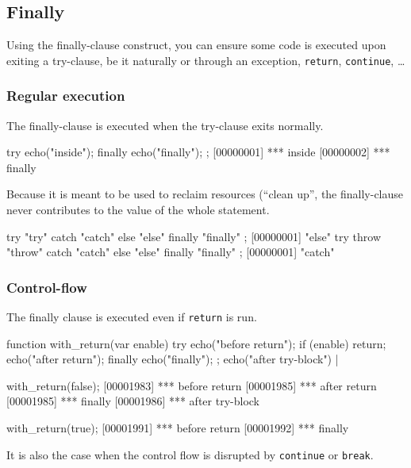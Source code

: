 \subsection{Finally}
\label{sec:lang:except:finally}
Using the finally-clause construct, you can ensure some code is executed
upon exiting a try-clause, be it naturally or through an exception,
\lstinline{return}, \lstinline{continue}, \ldots

\subsubsection{Regular execution}

The finally-clause is executed when the try-clause exits normally.

\begin{urbiscript}
try
{
  echo("inside");
}
finally
{
  echo("finally");
};
[00000001] *** inside
[00000002] *** finally
\end{urbiscript}

Because it is meant to be used to reclaim resources (``clean up'', the
finally-clause never contributes to the value of the whole statement.

\begin{urbiscript}
try { "try" } catch { "catch" } else { "else" } finally { "finally" };
[00000001] "else"
try { throw "throw" } catch { "catch" } else { "else" } finally { "finally" };
[00000001] "catch"
\end{urbiscript}


\subsubsection{Control-flow}

The finally clause is executed even if \lstinline{return} is run.

\begin{urbiscript}
function with_return(var enable)
{
  try
  {
    echo("before return");
    if (enable)
      return;
    echo("after return");
  }
  finally
  {
    echo("finally");
  };
  echo("after try-block")
}|

with_return(false);
[00001983] *** before return
[00001985] *** after return
[00001985] *** finally
[00001986] *** after try-block

with_return(true);
[00001991] *** before return
[00001992] *** finally
\end{urbiscript}

It is also the case when the control flow is disrupted by
\lstinline{continue} or \lstinline{break}.

